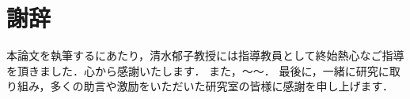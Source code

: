 \chapter*{謝辞} \label{sec:Acknowledgments}

本論文を執筆するにあたり，清水郁子教授には指導教員として終始熱心なご指導を頂きました．心から感謝いたします．
また，～～．
最後に，一緒に研究に取り組み，多くの助言や激励をいただいた研究室の皆様に感謝を申し上げます．

